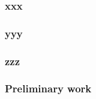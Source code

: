 

\vspace{-0.5em}
\subsubsection*{xxx}
\vspace{-1em}

\vspace{-0.5em}
\subsubsection*{yyy}
\vspace{-1em}

\vspace{-0.5em}
\subsubsection*{zzz}
\vspace{-1em}

\vspace{-0.5em}
\subsubsection*{Preliminary work}
\label{sec:preliminary_work}
\vspace{-1em}
